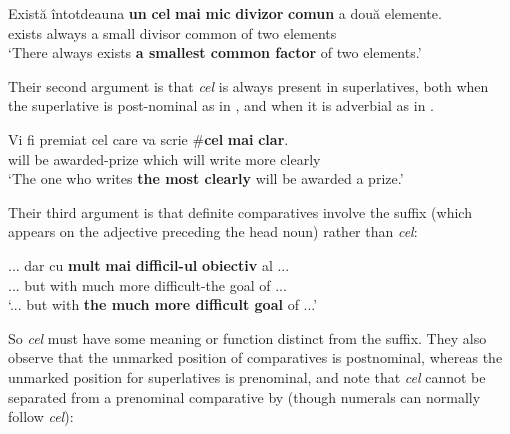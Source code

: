 \documentclass[output=paper
,modfonts
,nonflat]{langsci/langscibook}
\begin{document}
\ea \label{ex:coppockstrand:35}
\gll Există \^intotdeauna \textbf{un} \textbf{cel} \textbf{mai} \textbf{mic} \textbf{divizor} \textbf{comun} a două elemente.\\
exists always a  \cmpr{} small divisor common of two elements\\
\glt `There always exists \textbf{a smallest common factor} of two elements.'
\z

Their second argument is that \textit{cel} is always present in superlatives, both when the superlative is post-nominal as in , and when it is adverbial as in . 

\ea \label{ex:coppockstrand:36}
\gll Vi fi premiat cel care va scrie \textnormal{\#}{\op}\textbf{cel}{\cp} \textbf{mai} \textbf{clar}.\\
will be awarded-prize  which will write \phantom{\#(} more clearly\\
\glt `The one who writes \textbf{the most clearly} will be awarded a prize.' \citep[15, ex.\ 66]{Dobrovie-SorinGiurgea2015}
\z

Their third argument is that definite comparatives involve the suffix (which appears on the adjective preceding the head noun) rather than \textit{cel}:

\ea \label{ex:coppockstrand:37}
\gll ... dar cu \textbf{mult} \textbf{mai} \textbf{difficil-ul} \textbf{obiectiv} al ...\\
... but with much more difficult-the goal of ... \\
\glt `... but with \textbf{the much more difficult goal} of ...'
\z

So \textit{cel} must have some meaning or function distinct from the suffix. They also observe that the unmarked position of comparatives is postnominal, whereas the unmarked position for superlatives is prenominal, and note that \textit{cel} cannot be separated from a prenominal comparative by  (though numerals can normally follow \textit{cel}):

\ea \label{ex:coppockstrand:38}
\begin{xlist}
\end{xlist}
\z
\end{document}
